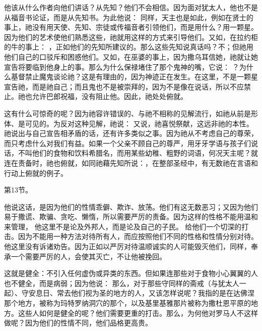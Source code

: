 他该从什么作者向他们讲话？从先知？他们不会相信。因为面对犹太人，他也不是从福音书论证，而是从先知书。为此他说：  同样，天主也是如此，例如在贤士的事上，祂没有用天使、先知、宗徒或传福音者引领他们，而是用什么？用一颗星。因为他们的艺术使他们熟悉这些，祂就用这样的方式来引导他们。又如，在拉约柜的牛的事上： ，正如他们的先知所建议的。那么这些先知说真话吗？不；但祂用他们自己的口驳斥和困惑他们。又如，在巫婆的事上，因为撒乌耳信她，祂就让她宣告将要临到他身上的事。那么为什么保禄堵住了那个鬼神的嘴，它说： ？为什么基督禁止魔鬼谈论祂？这是有理由的，因为神迹正在发生。在这里，不是一颗星宣告祂，而是祂自己；而且鬼也不是被崇拜的，因为不是像在说话，所以不应禁止。祂也允许巴郎祝福，没有阻止他。因此，祂处处俯就。\par

这有什么可惊奇的呢？因为祂容许错误的、与祂不相称的见解流行，如祂从前是形体、是可见的。为反对这种见解，祂说： 又说，祂喜悦祭献，这远非祂的本性。祂说出与自己宣告相矛盾的话，还有许多类似之事。因为祂从不考虑自己的尊荣，而只考虑什么对我们有益。如果一个父亲不顾自己的尊严，用牙牙学语与孩子们说话，不叫他们的食物和饮料希腊名，而用某些幼稚、粗野的词语，何况天主呢？就连在责备时，祂也俯就，如同祂藉先知所说：，在整部圣经中，有无数祂在言语和行动上俯就的例子。\par

第13节。\par

他说这话，是因为他们的性情乖僻、欺诈、放荡。他们有这无数恶习；又因为他们易于撒谎、欺骗、贪吃、懒惰，所以需要严厉的责备。因为这样的性格不能用温和来管理， 他这里不是论及外邦人，而是论及自己的子民。 给他们一个切深的打击。因为不能用一种方法对待所有人，而应按照他们不同的性格和性情分别对待。他这里没有诉诸劝告。因为正如以严厉对待温顺诚实的人可能毁灭他们，同样，奉承一个需要严厉的人，会使其灭亡，不让他被挽回。\par

\par

这就是健全：不引入任何虚伪或异类的东西。但如果连那些对于食物小心翼翼的人也不健全，而是病弱；因为他说： 那么，对于那些守同样的斋戒（与犹太人一起）、守安息日、常去他们视为圣的地方的人，又该怎样说呢？我指的是在达佛涅那个地方，被称为玛特罗纳洞穴的那个，以及基里基雅那片被称为撒杜恩平原的地方。这些人如何是健全的呢？他们需要更重的打击。那么，为何他对罗马人不这样做呢？因为他们的性情不同，他们品格更高贵。\par


